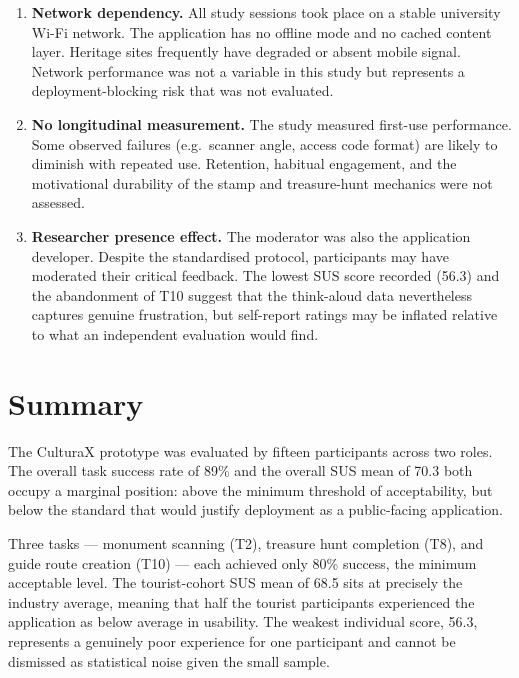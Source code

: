 \begin{enumerate}
  \item \textbf{Network dependency.} All study sessions took place on a stable
        university Wi-Fi network. The application has no offline mode and no cached
        content layer. Heritage sites frequently have degraded or absent mobile signal.
        Network performance was not a variable in this study but represents a
        deployment-blocking risk that was not evaluated.

  \item \textbf{No longitudinal measurement.} The study measured first-use performance.
        Some observed failures (e.g.\ scanner angle, access code format) are likely to
        diminish with repeated use. Retention, habitual engagement, and the motivational
        durability of the stamp and treasure-hunt mechanics were not assessed.

  \item \textbf{Researcher presence effect.} The moderator was also the application
        developer. Despite the standardised protocol, participants may have moderated
        their critical feedback. The lowest SUS score recorded (56.3) and the
        abandonment of T10 suggest that the think-aloud data nevertheless captures
        genuine frustration, but self-report ratings may be inflated relative to what
        an independent evaluation would find.
\end{enumerate}

\section{Summary}
\label{sec:summary}

The CulturaX prototype was evaluated by fifteen participants across two roles. The
overall task success rate of 89\% and the overall SUS mean of 70.3 both occupy a
marginal position: above the minimum threshold of acceptability, but below the standard
that would justify deployment as a public-facing application.

Three tasks — monument scanning (T2), treasure hunt completion (T8), and guide route
creation (T10) — each achieved only 80\% success, the minimum acceptable level. The
tourist-cohort SUS mean of 68.5 sits at precisely the industry average, meaning that
half the tourist participants experienced the application as below average in usability.
The weakest individual score, 56.3, represents a genuinely poor experience for one
participant and cannot be dismissed as statistical noise given the small sample.

